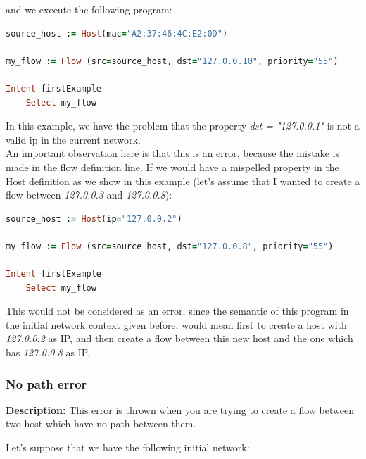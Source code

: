 and we execute the following program:

\begin{lstlisting}[language=Ruby,breaklines=true]
source_host := Host(mac="A2:37:46:4C:E2:0D")

my_flow := Flow (src=source_host, dst="127.0.0.10", priority="55")

Intent firstExample
    Select my_flow
\end{lstlisting}

In this example, we have the problem that the property \textit{dst = "127.0.0.1"} is not a valid ip in the current network. \\

An important observation here is that this is an error, because the mistake is made in the flow definition line. If we would have a mispelled property in the Host definition as we show in this example (let's assume that I wanted to create a flow between \textit{127.0.0.3} and \textit{127.0.0.8}):

\begin{lstlisting}[language=Ruby,breaklines=true]
source_host := Host(ip="127.0.0.2")

my_flow := Flow (src=source_host, dst="127.0.0.8", priority="55")

Intent firstExample
    Select my_flow
\end{lstlisting}

This would not be considered as an error, since the semantic of this program in the initial network context given before, would mean first to create a host with \textit{127.0.0.2} as IP, and then create a flow between this new host and the one which has \textit{127.0.0.8} as IP.

\subsubsection{No path error}

\textbf{Description:} This error is thrown when you are trying to create a flow between two host which have no path between them.

Let's suppose that we have the following initial network:

